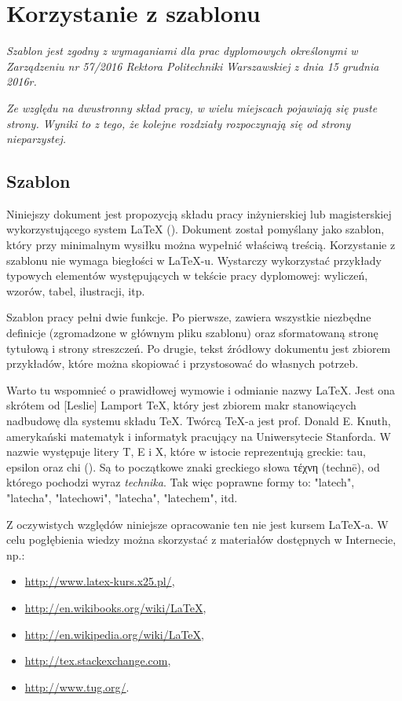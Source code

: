 \chapter{Korzystanie z szablonu}

\textit{Szablon jest zgodny z wymaganiami dla prac dyplomowych określonymi w Zarządzeniu nr 57/2016 Rektora Politechniki Warszawskiej z dnia 15 grudnia 2016r.}

\textit{Ze względu na dwustronny skład pracy, w wielu miejscach pojawiają się puste strony. Wyniki to z tego, że kolejne rozdziały rozpoczynają się od strony nieparzystej.}

\section{Szablon}
Niniejszy dokument jest propozycją składu pracy inżynierskiej lub magisterskiej  wykorzystującego  system {\LaTeX} (\cite{TUG, wikibook, wikilatex}). 
Dokument został  pomyślany jako szablon, który przy minimalnym wysiłku można wypełnić właściwą treścią. Korzystanie z szablonu nie wymaga biegłości w  {\LaTeX}-u. Wystarczy wykorzystać przykłady  typowych elementów występujących w tekście pracy dyplomowej: wyliczeń, wzorów, tabel, ilustracji, itp. 

Szablon pracy pełni dwie funkcje. Po pierwsze, zawiera wszystkie niezbędne definicje (zgromadzone w głównym pliku szablonu) oraz  sformatowaną stronę tytułową i strony streszczeń. Po drugie, tekst źródłowy dokumentu jest zbiorem przykładów, które można skopiować i przystosować do własnych potrzeb.


Warto tu wspomnieć o prawidłowej wymowie i odmianie nazwy {\LaTeX}. Jest ona skrótem od [Leslie] Lamport {\TeX}, który jest zbiorem makr stanowiących nadbudowę dla systemu składu {\TeX}. Twórcą  {\TeX-a}  jest prof. Donald E. Knuth, amerykański matematyk i informatyk pracujący na Uniwersytecie Stanforda. W nazwie występuje litery Τ, Ε i Χ, które w istocie reprezentują greckie: tau, epsilon oraz chi (\Tau\epsilon\Chi). Są to początkowe znaki greckiego słowa τέχνη (technē), od którego pochodzi wyraz \textit{technika}. Tak więc poprawne formy to: "latech", "latecha", "latechowi", "latecha", "latechem", itd.

Z oczywistych względów niniejsze opracowanie ten nie jest kursem {\LaTeX}-a. W celu pogłębienia wiedzy  można skorzystać z materiałów dostępnych w Internecie, np.:
\begin{itemize}
\item \url {http://www.latex-kurs.x25.pl/},
\item \url {http://en.wikibooks.org/wiki/LaTeX},
\item \url {http://en.wikipedia.org/wiki/LaTeX},
\item \url {http://tex.stackexchange.com},
\item \url {http://www.tug.org/}.
\end{itemize}





